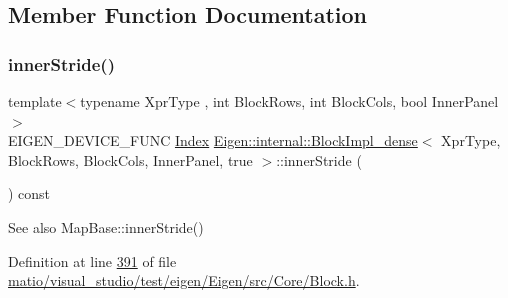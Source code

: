 \subsection{Member Function Documentation}
\mbox{\label{class_eigen_1_1internal_1_1_block_impl__dense_3_01_xpr_type_00_01_block_rows_00_01_block_cols_00_01_inner_panel_00_01true_01_4_a91fea2e027a3b057b5f70ab52a1a24b7}} 
\subsubsection{\texorpdfstring{inner\+Stride()}{innerStride()}\hspace{0.1cm}{\footnotesize\ttfamily [1/2]}}
{\footnotesize\ttfamily template$<$typename Xpr\+Type , int Block\+Rows, int Block\+Cols, bool Inner\+Panel$>$ \\
E\+I\+G\+E\+N\+\_\+\+D\+E\+V\+I\+C\+E\+\_\+\+F\+U\+NC \hyperlink{namespace_eigen_a62e77e0933482dafde8fe197d9a2cfde}{Index} \hyperlink{class_eigen_1_1internal_1_1_block_impl__dense}{Eigen\+::internal\+::\+Block\+Impl\+\_\+dense}$<$ Xpr\+Type, Block\+Rows, Block\+Cols, Inner\+Panel, true $>$\+::inner\+Stride (\begin{DoxyParamCaption}{ }\end{DoxyParamCaption}) const\hspace{0.3cm}{\ttfamily [inline]}}

\begin{DoxySeeAlso}{See also}
Map\+Base\+::inner\+Stride() 
\end{DoxySeeAlso}


Definition at line \hyperlink{matio_2visual__studio_2test_2eigen_2_eigen_2src_2_core_2_block_8h_source_l00391}{391} of file \hyperlink{matio_2visual__studio_2test_2eigen_2_eigen_2src_2_core_2_block_8h_source}{matio/visual\+\_\+studio/test/eigen/\+Eigen/src/\+Core/\+Block.\+h}.

